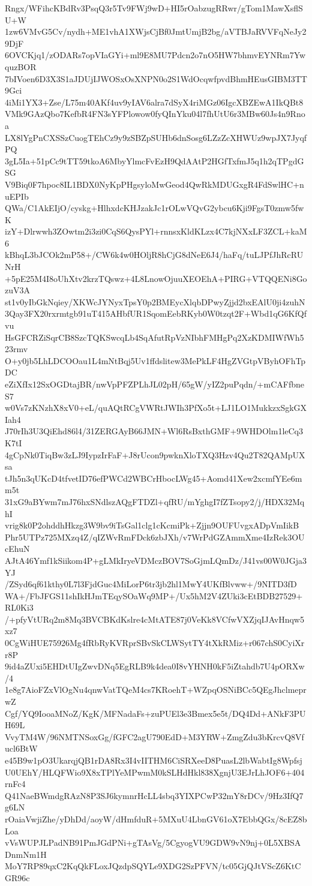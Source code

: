Rngx/WFihcKBdRv3PsqQ3r5Tv9FWj9wD+HI5rOabzugRRwr/gTom1MawXsflSU+W
1zw6VMvG5Cv/nydh+ME1vhA1XWjsCjBf0JmtUmjB2bg/aVTBJaRVVFqNeJy29DjF
6OVCKjq1/zODARs7opVIaGYi+ml9E8MU7Pdcn2o7nO5HW7bhmvEYNRm7YwquzBOR
7bIVoen6D3X3S1aJDUjIJWOSxOsXNPN0o2S1WdOcqwfpvdBhmHEusGIBM3TT9Gci
4iMi1YX3+Zse/L75m40AKf4uv9yIAV6alra7dSyX4riMGz06IgcXBZEwA1IkQBt8
VMk9GAzQbo7KefbR4FN3sYFPlowow0fyQInYku04l7fhUtU6r3MBw60Js4n9Rnoa
LX8lYgPnCXSSzCuogTEhCz9y9zSBZpSUHb6dnSosg6LZzZcXHWUz9wpJX7JyqfPQ
3gL5Ia+51pCc9tTT59tkoA6MbyYlmcFvEzH9QdAAtP2HGfTxfmJ5q1h2qTPgdGSG
V9Biq0F7hpoc8IL1BDX0NyKpPHgsyloMwGeod4QwRkMDUGxgR4FdSwlHC+nuEPIb
QWa/C1AkEIjO/cyskg+HlhxdcKHJzakJc1rOLwVQvG2ybcu6Kji9FgsT0zmw5fwK
izY+Dlrwwh3ZOwtm2i3zi0CqS6QysPYl+rnnsxKldKLzx4C7kjNXxLF3ZCL+kaM6
kBhqL3bJCOk2mP58+/CW6k4w0HOljR8hCjG8dNeE6J4/haFq/tuLJPfJhRcRUNrH
+5pE25M4I8oUhXtv2krzTQswz+4L8LnowOjuuXEOEhA+PIRG+VTQQENi8GozuV3A
st1v0yIbGkNqiey/XKWcJYNyxTpsY0p2BMEycXlqbDPwyZjjd2bxEAlU0ji4zuhN
3Qay3FX20rxrmtgb91uT415AHbfUR1SqomEebRKyb0W0tzqt2F+Wbd1qG6KfQfvu
HsGFCRZiSqrCB8SzcTQKSwcqLb4SqAfutRpVzNIbhFMHgPq2XzKDMIWfWh523rmv
O+y0jb5LhLDCOOau1L4mNtBqj5Uv1ffdslitew3MePkLF4HgZVGtpVByhOFhTpDC
eZiXfIx12SxOGDtajBR/nwVpPFZPLhJL02pH/65gW/yIZ2puPqdn/+mCAFfbneS7
w0Vs7zKNzhX8xV0+eL/quAQtRCgVWRtJWIh3PfXo5t+LJ1LO1MukkzxSgkGXIah4
J70rIh3U3QiEhd86l4/31ZERGAyB66JMN+Wl6RsBxthGMF+9WHDOlm1leCq3K7tI
4gCpNk0TiqBw3zLJ9IypzIrFaF+J8rUcon9pwknXloTXQ3Hzv4Qu2T82QAMpUXsa
tJh5n3qUKcD4tfvetID76efPWCd2WBCrHbocLWg45+Aomd41Xew2xcmfYEe6mm5t
31xG9aBYwm7mJ76hxSNdlszAQgFTDZl+qfRU/mYghgI7fZTsopy2/j/HDX32MqhI
vrig8k0P2ohddhHkzg3W9bv9iTsGal1clg1cKcmiPk+Zjjn9OUFUvgxADpVmIikB
Phr5UTPz725MXzq4Z/qIZWvRmFDck6zbJXh/v7WrPdGZAmmXme4IzRek3OUcEhuN
AJtA46Ymf1kSiikom4P+gLMkIryeVDMczBOV7SoGjmLQmDz/J41vs00W0JGja3YJ
/ZSyd6qf61kthy0L7l3FjdGuc4MiLorP6tr3jb2hl1MwY4UKfBlvww+/9NITD3fD
WA+/FbJFGS11shIkHJmTEqySOaWq9MP+/Ux5hM2V4ZUki3cEtBDB27529+RL0Ki3
/+pfyVtURq2m8Mq3BVCBKdKslre4cMtATE87j0VeKk8VCfwVXZjqIJAvHnqw5xz7
0CgWiHUE75926Mg4fRbRyKVRprSBvSkCLWSytTY4tXkRMiz+r067chS0CyiXrr8P
9id4aZUxi5EHDtUIgZwvDNq5EgRLB9k4dea0I8vYHNH0kF5iZtahdb7U4pORXw/4
1e8g7AioFZxVlOgNu4qnwVatTQeM4cs7KRoehT+WZpqOSNiBCc5QEgJhclmeprwZ
Cgf/YQ9IooaMNoZ/KgK/MFNadaFs+zuPUEl3e3Bmex5e5t/DQ4Dd+ANkF3PUH69L
VvyTM4W/96NMTNSoxGg/fGFC2agU790EdD+M3YRW+ZmgZdu3bKrcvQ8Vfucl6BtW
e45B9w1pO3UkarqjQB1rDA8Rx3I4vIITHM6CiSRXeeD8PuasL2lbWabtIg8Wpfsj
U0UEhY/HLQFWio9X8xTPlYeMPwmM0kSLHdHkl838XgnjU3EJrLhJOF6+404rnFc4
Q41NaeBWmdgRAzN8P3SJ6kymnrHcLL4sbq3YIXPCwP32mY8rDCv/9Hz3IfQ7g6LN
rOaiaVwjiZhe/yDhDd/aoyW/dHmfduR+5MXuU4LbnGV61oX7EbbQGx/8cEZ8bLoa
vVsWUPJLPadNB91PmJGdPNi+gTAsVg/5CgyogVU9GDW9vN9nj+0L5XBSADnmNm1H
MoY7RP89qxC2KqQkFLoxJQzdpSQYLe9XDG2SzPFVN/tc05GjQJtVScZ6KtCGR96c
